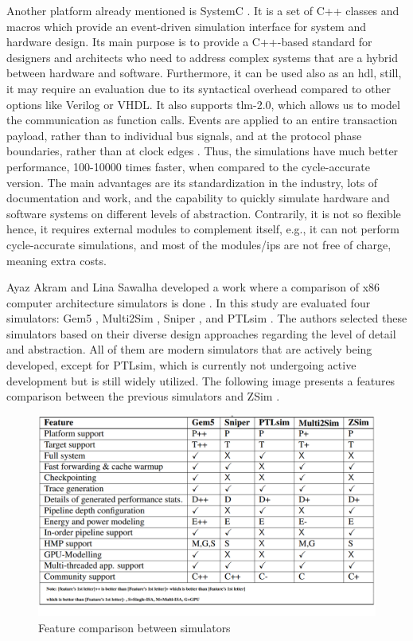 Another platform already mentioned is SystemC \cite{systemC}. It is a set of C++ classes and macros which provide an event-driven simulation 
interface for system and hardware design. Its main purpose is to provide a C++-based standard for designers and architects who need to address 
complex systems that are a hybrid between hardware and software. Furthermore, it can be used also as an \gls{hdl}, still, it may require an 
evaluation due to its syntactical overhead compared to other options like Verilog or VHDL. It also supports \gls{tlm}-2.0, which allows us to 
model the communication as function calls. Events are applied to an entire transaction payload, rather than to individual bus signals, and at 
the protocol phase
boundaries, rather than at clock edges \cite{wieman2012overview}. Thus, the simulations have much better performance, 100-10000 times faster, 
when compared to the cycle-accurate version. The main advantages are its standardization in the industry, lots of documentation and work, and 
the capability to quickly simulate hardware and software systems on different levels of abstraction. Contrarily, it is not so flexible hence, 
it requires external modules to complement itself, e.g., it can not perform cycle-accurate simulations, and most of the modules/\glspl{ip} are 
not free of charge, meaning extra costs. 


Ayaz Akram and Lina Sawalha developed a work where a comparison of x86 computer architecture simulators is done \cite{akram2016comparison}. In 
this study are evaluated four simulators: Gem5 \cite{TheGem5Simulator}, Multi2Sim \cite{ubal2012multi2sim}, Sniper \cite{carlson2011sniper}, 
and PTLsim \cite{yourst2007ptlsim}. The authors selected these simulators based on their diverse design approaches regarding the level of 
detail and abstraction. All of them are modern simulators that are actively being developed, except for PTLsim, which is currently not 
undergoing active development but is still widely utilized. The following image presents a features comparison between the previous simulators 
and ZSim \cite{sanchez2013zsim}. 

\begin{figure}[H]
	\centering
 	\includegraphics[width=0.7\linewidth]{Images/ComparationTableSimulators.png}
 	\caption{Feature comparison between simulators \cite{akram2016comparison}}
	 \label{fig_ComparationTableSimulators}
\end{figure}

